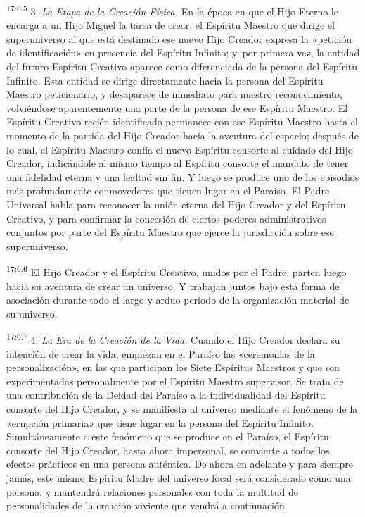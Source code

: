 \par
\textsuperscript{17:6.5} 3. \textit{La Etapa de la Creación Física.} En la época en que el Hijo Eterno le encarga a un Hijo Miguel la tarea de crear, el Espíritu Maestro que dirige el superuniverso al que está destinado ese nuevo Hijo Creador expresa la «petición de identificación» en presencia del Espíritu Infinito; y, por primera vez, la entidad del futuro Espíritu Creativo aparece como diferenciada de la persona del Espíritu Infinito. Esta entidad se dirige directamente hacia la persona del Espíritu Maestro peticionario, y desaparece de inmediato para nuestro reconocimiento, volviéndose aparentemente una parte de la persona de ese Espíritu Maestro. El Espíritu Creativo recién identificado permanece con ese Espíritu Maestro hasta el momento de la partida del Hijo Creador hacia la aventura del espacio; después de lo cual, el Espíritu Maestro confía el nuevo Espíritu consorte al cuidado del Hijo Creador, indicándole al mismo tiempo al Espíritu consorte el mandato de tener una fidelidad eterna y una lealtad sin fin. Y luego se produce uno de los episodios más profundamente conmovedores que tienen lugar en el Paraíso. El Padre Universal habla para reconocer la unión eterna del Hijo Creador y del Espíritu Creativo, y para confirmar la concesión de ciertos poderes administrativos conjuntos por parte del Espíritu Maestro que ejerce la jurisdicción sobre ese superuniverso.

\par
\textsuperscript{17:6.6} El Hijo Creador y el Espíritu Creativo, unidos por el Padre, parten luego hacia su aventura de crear un universo. Y trabajan juntos bajo esta forma de asociación durante todo el largo y arduo período de la organización material de su universo.

\par
\textsuperscript{17:6.7} 4. \textit{La Era de la Creación de la Vida.} Cuando el Hijo Creador declara su intención de crear la vida, empiezan en el Paraíso las «ceremonias de la personalización», en las que participan los Siete Espíritus Maestros y que son experimentadas personalmente por el Espíritu Maestro supervisor. Se trata de una contribución de la Deidad del Paraíso a la individualidad del Espíritu consorte del Hijo Creador, y se manifiesta al universo mediante el fenómeno de la «erupción primaria» que tiene lugar en la persona del Espíritu Infinito. Simultáneamente a este fenómeno que se produce en el Paraíso, el Espíritu consorte del Hijo Creador, hasta ahora impersonal, se convierte a todos los efectos prácticos en una persona auténtica. De ahora en adelante y para siempre jamás, este mismo Espíritu Madre del universo local será considerado como una persona, y mantendrá relaciones personales con toda la multitud de personalidades de la creación viviente que vendrá a continuación.

